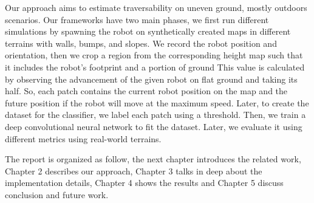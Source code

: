 \documentclass[../document.tex]{subfiles}
\begin{document}
Our approach aims to estimate traversability on uneven ground, mostly outdoors scenarios. Our frameworks have two main phases, we first run different simulations by spawning the robot on synthetically
created maps in different terrains with walls, bumps, and slopes. We record the robot position and orientation, then we crop a region from the corresponding height map such that it includes the robot's footprint and a portion of ground This value is calculated by observing the advancement of the given robot on flat ground and taking its half. So, each patch contains the current robot position on the map and the future position if the robot will move at the maximum speed. Later, to create the dataset for the classifier, we label each patch using a threshold. Then, we train a deep convolutional neural network to fit the dataset. Later, we evaluate it using different metrics using real-world terrains.

The report is organized as follow, the next chapter introduces the related work, Chapter 2 describes our approach, Chapter 3 talks in deep about the implementation details,
Chapter 4 shows the results and Chapter 5 discuss conclusion and future work.
\end{document}
